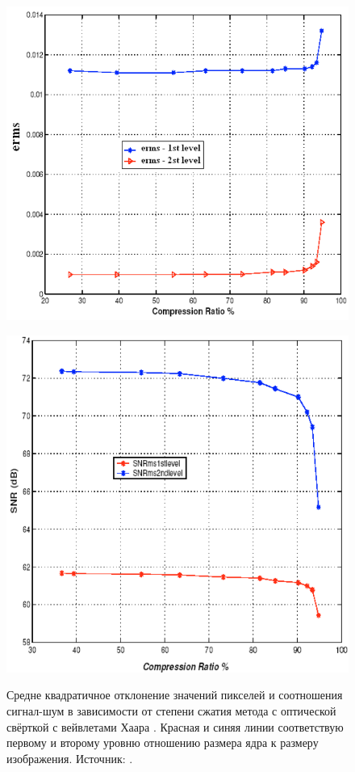 \begin{figure}[h]
	\centering
		\begin{minipage}{.40\textwidth}
			\includegraphics[width=\linewidth]{figures/VLCERMS.png}
			\label{ris:VLCERMS}
		\end{minipage}
		\hfill
		\begin{minipage}{.40\textwidth}
			\includegraphics[width=0.95\linewidth]{figures/VLCSNR.png}
			\label{ris:VLCSNR}
		\end{minipage}
		\caption{Средне квадратичное отклонение значений пикселей и соотношения сигнал-шум в зависимости от степени сжатия метода с оптической свёрткой с вейвлетами Хаара \cite{alkholidi2008real}. Красная и синяя линии соответствую первому и второму уровню отношению размера ядра к размеру изображения. Источник: \cite{alkholidi2008real}.}
		\label{ris:VLCERMSSNR}
\end{figure}

